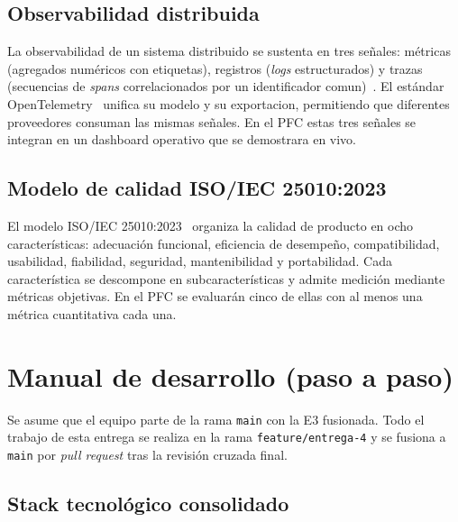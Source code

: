 \documentclass[11pt,a4paper]{article}
\begin{document}
\subsection{Observabilidad distribuida}

    La observabilidad de un sistema distribuido se sustenta en tres señales: métricas (agregados numéricos con etiquetas), registros (\textit{logs} estructurados) y trazas (secuencias de \textit{spans} correlacionados por un identificador comun)~\cite{Sigelman2010Dapper,Beyer2016SRE}. El estándar OpenTelemetry~\cite{OpenTelemetry2024} unifica su modelo y su exportacion, permitiendo que diferentes proveedores consuman las mismas señales. En el PFC estas tres señales se integran en un dashboard operativo que se demostrara en vivo.

\subsection{Modelo de calidad ISO/IEC 25010:2023}

    El modelo ISO/IEC 25010:2023~\cite{ISO25010_2023} organiza la calidad de producto en ocho características: adecuación funcional, eficiencia de desempeño, compatibilidad, usabilidad, fiabilidad, seguridad, mantenibilidad y portabilidad. Cada característica se descompone en subcaracterísticas y admite medición mediante métricas objetivas. En el PFC se evaluarán cinco de ellas con al menos una métrica cuantitativa cada una.

\section{Manual de desarrollo (paso a paso)}

    Se asume que el equipo parte de la rama \texttt{main} con la E3 fusionada. Todo el trabajo de esta entrega se realiza en la rama \texttt{feature/entrega-4} y se fusiona a \texttt{main} por \textit{pull request} tras la revisión cruzada final.

\subsection{Stack tecnológico consolidado}
\end{document}
